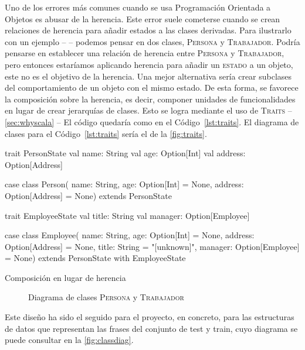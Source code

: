 Uno de los errores más comunes cuando se usa Programación Orientada a Objetos es
abusar de la herencia. Este error suele cometerse cuando se crean relaciones de
herencia para añadir estados a las clases derivadas. Para ilustrarlo con un
ejemplo -- \citet{Dean2015} -- podemos pensar en dos clases, \textsc{Persona} y
\textsc{Trabajador}. Podría pensarse en establecer una relación de herencia
entre \textsc{Persona} y \textsc{Trabajador}, pero entonces estaríamos aplicando
herencia para añadir un \textsc{estado} a un objeto, este no es el objetivo de
la herencia. Una mejor alternativa sería crear subclases del comportamiento de
un objeto con el mismo estado. De esta forma, se favorece la composición sobre
la herencia, es decir, componer unidades de funcionalidades en lugar de crear
jerarquías de clases. Esto se logra mediante el uso de \textsc{Traits} --
\autoref{sec:whyscala} -- El código quedaría como en el Código~\autoref{lst:traits}. El
diagrama de clases para el Código~\ref{lst:traits} sería el de la
\autoref{fig:traits}.
\begin{listing}[H]
  \begin{scalacode}
    trait PersonState {
      val name: String
      val age: Option[Int]
      val address: Option[Address]
    }

    case class Person(
      name: String,
      age: Option[Int] = None,
      address: Option[Address] = None) extends PersonState

    trait EmployeeState {
      val title: String
      val manager: Option[Employee]
    }

    case class Employee(
      name: String,
      age: Option[Int] = None,        
      address: Option[Address] = None,
      title: String = "[unknown]",
      manager: Option[Employee] = None)
    extends PersonState with EmployeeState
  \end{scalacode}
  \caption{Composición en lugar de herencia}
  \label{lst:traits}
\end{listing}
\begin{figure}[ht]
  \centering
  \caption{Diagrama de clases \textsc{Persona} y \textsc{Trabajador}}
  \label{fig:traits}
\end{figure}
Este diseño ha sido el seguido para el proyecto, en concreto, para las
estructuras de datos que representan las frases del conjunto de test y train,
cuyo diagrama se puede consultar en la \autoref{fig:classdiag}.


